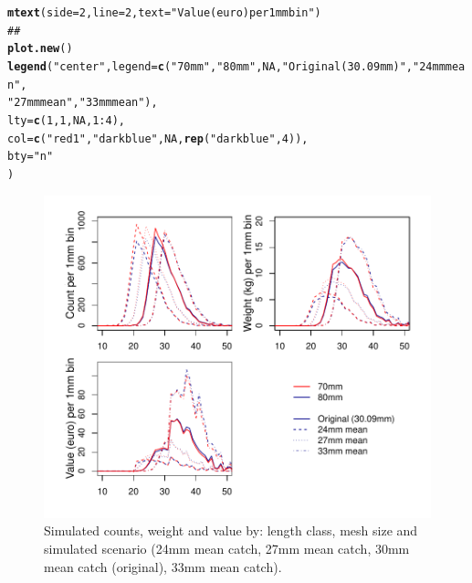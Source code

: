 \documentclass[12pt]{article}\usepackage[]{graphicx}\usepackage[]{color}
\makeatletter
\def\maxwidth{ %
  \ifdim\Gin@nat@width>\linewidth
    \linewidth
  \else
    \Gin@nat@width
  \fi
}
\newcommand{\hlnum}[1]{\textcolor[rgb]{0.686,0.059,0.569}{#1}}%
\newcommand{\hlstr}[1]{\textcolor[rgb]{0.192,0.494,0.8}{#1}}%
\newcommand{\hlcom}[1]{\textcolor[rgb]{0.678,0.584,0.686}{\textit{#1}}}%
\newcommand{\hlopt}[1]{\textcolor[rgb]{0,0,0}{#1}}%
\newcommand{\hlstd}[1]{\textcolor[rgb]{0.345,0.345,0.345}{#1}}%
\newcommand{\hlkwc}[1]{\textcolor[rgb]{0.333,0.667,0.333}{#1}}%
\newcommand{\hlkwd}[1]{\textcolor[rgb]{0.737,0.353,0.396}{\textbf{#1}}}%
\newenvironment{kframe}{%
 \def\at@end@of@kframe{}%
 \ifinner\ifhmode%
  \def\at@end@of@kframe{\end{minipage}}%
  \begin{minipage}{\columnwidth}%
 \fi\fi%
 \def\FrameCommand##1{\hskip\@totalleftmargin \hskip-\fboxsep
 \colorbox{shadecolor}{##1}\hskip-\fboxsep
     \hskip-\linewidth \hskip-\@totalleftmargin \hskip\columnwidth}%
 \MakeFramed {\advance\hsize-\width
   \@totalleftmargin\z@ \linewidth\hsize
   \@setminipage}}%
 {\par\unskip\endMakeFramed%
 \at@end@of@kframe}
\newenvironment{knitrout}{}{} %
\makeatother
\begin{document}
\begin{knitrout}
\begin{kframe}
\begin{alltt}
\hlkwd{mtext}\hlstd{(}\hlkwc{side} \hlstd{=} \hlnum{2}\hlstd{,} \hlkwc{line} \hlstd{=} \hlnum{2}\hlstd{,} \hlkwc{text} \hlstd{=} \hlstr{"Value (euro) per 1mm bin"}\hlstd{)}
\hlcom{##}
\hlkwd{plot.new}\hlstd{()}
\hlkwd{legend}\hlstd{(}\hlstr{"center"}\hlstd{,} \hlkwc{legend} \hlstd{=} \hlkwd{c}\hlstd{(}\hlstr{"70mm"}\hlstd{,} \hlstr{"80mm"}\hlstd{,} \hlnum{NA}\hlstd{,} \hlstr{"Original (30.09mm)"}\hlstd{,} \hlstr{"24mm mean"}\hlstd{,}
                   \hlstr{"27mm mean"}\hlstd{,} \hlstr{"33mm mean"}\hlstd{),}
       \hlkwc{lty} \hlstd{=} \hlkwd{c}\hlstd{(}\hlnum{1}\hlstd{,}\hlnum{1}\hlstd{,}\hlnum{NA}\hlstd{,} \hlnum{1}\hlopt{:}\hlnum{4}\hlstd{),}
       \hlkwc{col} \hlstd{=} \hlkwd{c}\hlstd{(}\hlstr{"red1"}\hlstd{,} \hlstr{"darkblue"}\hlstd{,} \hlnum{NA}\hlstd{,} \hlkwd{rep}\hlstd{(}\hlstr{"darkblue"}\hlstd{,} \hlnum{4}\hlstd{)),}
       \hlkwc{bty} \hlstd{=} \hlstr{"n"}
       \hlstd{)}
\end{alltt}
\end{kframe}\begin{figure}
\includegraphics[width=\maxwidth]{figure/split_plots-1} \caption[Simulated counts, weight and value by]{Simulated counts, weight and value by: length class, mesh size and  simulated scenario (24mm mean catch, 27mm mean catch, 30mm mean catch (original), 33mm mean catch).}\label{fig:split_plots}
\end{figure}


\end{knitrout}
\end{document}
